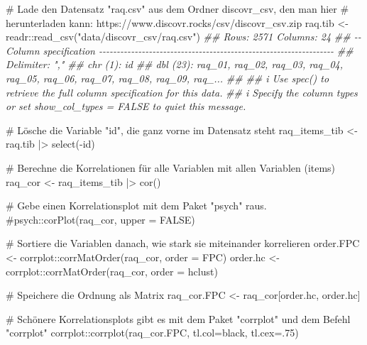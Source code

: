 \documentclass[
  10pt,
  letterpaper,
  a4paper, twoside]{scrreprt}
\newenvironment{Shaded}{\begin{snugshade}}{\end{snugshade}}
\newcommand{\AttributeTok}[1]{\textcolor[rgb]{0.40,0.45,0.13}{#1}}
\newcommand{\CommentTok}[1]{\textcolor[rgb]{0.37,0.37,0.37}{#1}}
\newcommand{\DecValTok}[1]{\textcolor[rgb]{0.68,0.00,0.00}{#1}}
\newcommand{\DocumentationTok}[1]{\textcolor[rgb]{0.37,0.37,0.37}{\textit{#1}}}
\newcommand{\FunctionTok}[1]{\textcolor[rgb]{0.28,0.35,0.67}{#1}}
\newcommand{\NormalTok}[1]{\textcolor[rgb]{0.00,0.23,0.31}{#1}}
\newcommand{\OtherTok}[1]{\textcolor[rgb]{0.00,0.23,0.31}{#1}}
\newcommand{\SpecialCharTok}[1]{\textcolor[rgb]{0.37,0.37,0.37}{#1}}
\newcommand{\StringTok}[1]{\textcolor[rgb]{0.13,0.47,0.30}{#1}}
\begin{document}
\begin{Shaded}
\begin{Highlighting}[]
\CommentTok{\# Lade den Datensatz "raq.csv" aus dem Ordner discovr\_csv, den man hier }
\CommentTok{\# herunterladen kann: https://www.discovr.rocks/csv/discovr\_csv.zip}
\NormalTok{raq.tib }\OtherTok{\textless{}{-}}\NormalTok{ readr}\SpecialCharTok{::}\FunctionTok{read\_csv}\NormalTok{(}\StringTok{"data/discovr\_csv/raq.csv"}\NormalTok{)}
\DocumentationTok{\#\# Rows: 2571 Columns: 24}
\DocumentationTok{\#\# {-}{-} Column specification {-}{-}{-}{-}{-}{-}{-}{-}{-}{-}{-}{-}{-}{-}{-}{-}{-}{-}{-}{-}{-}{-}{-}{-}{-}{-}{-}{-}{-}{-}{-}{-}{-}{-}{-}{-}{-}{-}{-}{-}{-}{-}{-}{-}{-}{-}{-}{-}{-}{-}{-}{-}{-}{-}{-}{-}{-}{-}{-}{-}{-}{-}{-}{-}{-}{-}}
\DocumentationTok{\#\# Delimiter: ","}
\DocumentationTok{\#\# chr  (1): id}
\DocumentationTok{\#\# dbl (23): raq\_01, raq\_02, raq\_03, raq\_04, raq\_05, raq\_06, raq\_07, raq\_08, raq\_09, raq\_...}
\DocumentationTok{\#\# }
\DocumentationTok{\#\# i Use \textasciigrave{}spec()\textasciigrave{} to retrieve the full column specification for this data.}
\DocumentationTok{\#\# i Specify the column types or set \textasciigrave{}show\_col\_types = FALSE\textasciigrave{} to quiet this message.}

\CommentTok{\# Lösche die Variable "id", die ganz vorne im Datensatz steht}
\NormalTok{raq\_items\_tib }\OtherTok{\textless{}{-}}\NormalTok{ raq.tib }\SpecialCharTok{|\textgreater{}} 
  \FunctionTok{select}\NormalTok{(}\SpecialCharTok{{-}}\NormalTok{id)}

\CommentTok{\# Berechne die Korrelationen für alle Variablen mit allen Variablen (items)}
\NormalTok{raq\_cor }\OtherTok{\textless{}{-}}\NormalTok{ raq\_items\_tib }\SpecialCharTok{|\textgreater{}} 
  \FunctionTok{cor}\NormalTok{()}

\CommentTok{\# Gebe einen Korrelationsplot mit dem Paket "psych" raus. }
\CommentTok{\#psych::corPlot(raq\_cor, upper = FALSE)}

\CommentTok{\# Sortiere die Variablen danach, wie stark sie miteinander korrelieren}
\NormalTok{order.FPC }\OtherTok{\textless{}{-}}\NormalTok{ corrplot}\SpecialCharTok{::}\FunctionTok{corrMatOrder}\NormalTok{(raq\_cor, }\AttributeTok{order =} \StringTok{\textquotesingle{}FPC\textquotesingle{}}\NormalTok{)}
\NormalTok{order.hc }\OtherTok{\textless{}{-}}\NormalTok{ corrplot}\SpecialCharTok{::}\FunctionTok{corrMatOrder}\NormalTok{(raq\_cor, }\AttributeTok{order =} \StringTok{\textquotesingle{}hclust\textquotesingle{}}\NormalTok{)}

\CommentTok{\# Speichere die Ordnung als Matrix}
\NormalTok{raq\_cor.FPC }\OtherTok{\textless{}{-}}\NormalTok{ raq\_cor[order.hc, order.hc]}

\CommentTok{\# Schönere Korrelationsplots gibt es mit dem Paket "corrplot" und dem Befehl "corrplot"}
\NormalTok{corrplot}\SpecialCharTok{::}\FunctionTok{corrplot}\NormalTok{(raq\_cor.FPC, }\AttributeTok{tl.col=}\StringTok{\textquotesingle{}black\textquotesingle{}}\NormalTok{, }\AttributeTok{tl.cex=}\NormalTok{.}\DecValTok{75}\NormalTok{) }
\end{Highlighting}
\end{Shaded}
\end{document}
